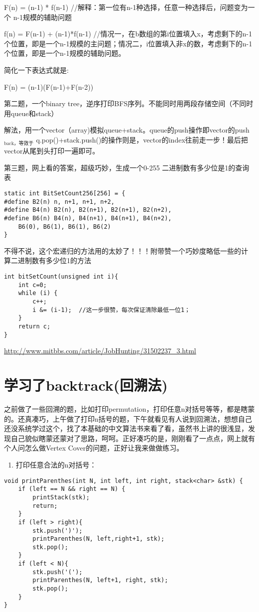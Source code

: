 \documentclass[12pt]{book}
\begin{document}
F(n) = (n-1) * f(n-1)    //解释：第一位有n-1种选择，任意一种选择后，问题变为一个 n-1规模的辅助问题

f(n) = F(n-1) + (n-1)*f(n-1)   //情况一，在b数组的第i位置填入x，考虑剩下的n-1个位置，即是一个n-1规模的主问题；情况二，i位置填入非x的数，考虑剩下的n-1个位置，即是一个n-1规模的辅助问题。

简化一下表达式就是:

F(n) = (n-1)(F(n-1)+F(n-2))

第二题，一个binary tree，逆序打印BFS序列。不能同时用两段存储空间（不同时用queue和stack）

解法，用一个vector（array)模拟queue+stack。queue的push操作即vector的push$_{\text{back，等效于}}$ q.pop()+stack.push()的操作则是，vector的index往前走一步！最后把vector从尾到头打印一遍即可。

第三题，网上看的答案，超级巧妙，生成一个0-255 二进制数有多少位是1的查询表
\lstset{language=java,label= ,caption= ,numbers=none}
\begin{lstlisting}
static int BitSetCount256[256] = {
#define B2(n) n, n+1, n+1, n+2,
#define B4(n) B2(n), B2(n+1), B2(n+1), B2(n+2),
#define B6(n) B4(n), B4(n+1), B4(n+1), B4(n+2),
    B6(0), B6(1), B6(1), B6(2)
}
\end{lstlisting}

不得不说，这个宏递归的方法用的太妙了！！！附带赞一个巧妙度略低一些的计
算二进制数有多少位1的方法
\lstset{language=java,label= ,caption= ,numbers=none}
\begin{lstlisting}
int bitSetCount(unsigned int i){
    int c=0;
    while (i) {
        c++;
        i &= (i-1);  //这一步很赞，每次保证清除最低一位1；
    }
    return c;
}
\end{lstlisting}

\url{http://www.mitbbs.com/article/JobHunting/31502237_3.html}

\section{学习了backtrack(回溯法)}
\label{sec-19-3}

之前做了一些回溯的题，比如打印permutation，打印任意n对括号等等，都是瞎蒙的。还真凑巧，上午做了打印n括号的题，下午就看见有人说到回溯法，想想自己还没系统学过这个，找了本基础的中文算法书来看了看，虽然书上讲的很浅显，发现自己貌似瞎蒙还蒙对了思路，呵呵。正好凑巧的是，刚刚看了一点点，网上就有个人问怎么做Vertex Cover的问题，正好让我来做做练习。

\begin{enumerate}
\item 打印任意合法的n对括号：
\end{enumerate}
\lstset{language=java,label= ,caption= ,numbers=none}
\begin{lstlisting}
void printParenthes(int N, int left, int right, stack<char> &stk) {
    if (left == N && right == N) {
        printStack(stk);
        return;
    }
    if (left > right){
        stk.push(')');
        printParenthes(N, left,right+1, stk);
        stk.pop();
    }
    if (left < N){
        stk.push('(');
        printParenthes(N, left+1, right, stk);
        stk.pop();
    }   
}
\end{lstlisting}
\end{document}
